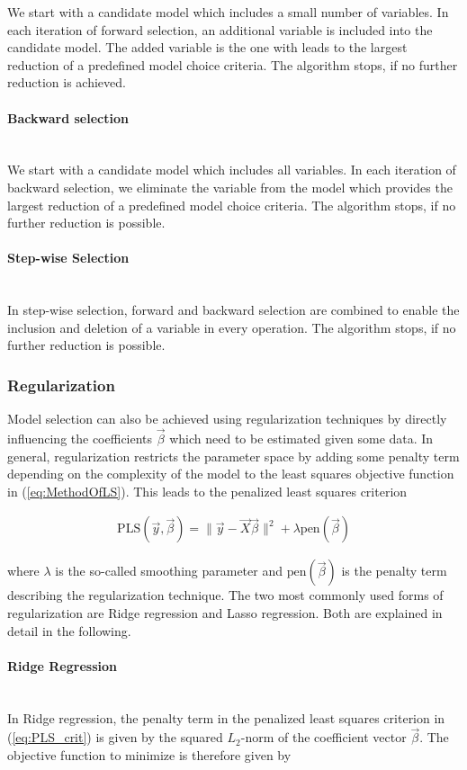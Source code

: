 \documentclass[10pt,a4paper]{report}
\newcommand{\subsubsubsection}[1]{\paragraph{#1}\mbox{}\\}
\begin{document}
We start with a candidate model which includes a small number of variables. In each iteration of forward selection, an additional variable is included into the candidate model.  The added variable is the one with leads to the largest reduction of a predefined model choice criteria. The algorithm stops, if no further reduction is achieved.

\subsubsubsection{Backward selection}

We start with a candidate model which includes all variables. In each iteration of backward selection, we eliminate the variable from the model which provides the largest reduction of a predefined model choice criteria. The algorithm stops, if no further reduction is possible. 

\subsubsubsection{Step-wise Selection}

In step-wise selection, forward and backward selection are combined to enable the inclusion and deletion of a variable in every operation. The algorithm stops, if no further reduction is possible.

\subsubsection{Regularization} \label{subsubsec:Regularization}

Model selection can also be achieved using regularization techniques by directly influencing the coefficients $\vec{\beta}$ which need to be estimated given some data. In general, regularization restricts the parameter space by adding some penalty term depending on the complexity of the model to the least squares objective function in (\ref{eq:MethodOfLS}). This leads to the penalized least squares criterion

\begin{align} \label{eq:PLS_crit}
	\text{PLS}(\vec{y}, \vec{\beta}) = \lVert \vec{y} - \vec{X} \vec{\beta}\rVert^2 + \lambda \text{pen}(\vec{\beta})
\end{align}

where $\lambda$ is the so-called smoothing parameter and $\text{pen}(\vec{\beta})$ is the penalty term describing the regularization technique. The two most commonly used forms of regularization are Ridge regression and Lasso regression. Both are explained in detail in the following.

\subsubsubsection{Ridge Regression}

In Ridge regression, the penalty term in the penalized least squares criterion in (\ref{eq:PLS_crit}) is given by the squared $L_2$-norm of the coefficient vector $\vec{\beta}$. The objective function to minimize is therefore given by
\end{document}
